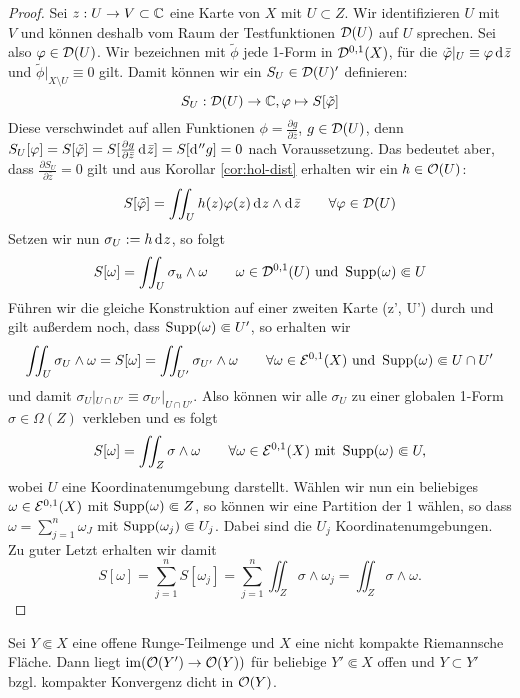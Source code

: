 \begin{proof}
  Sei $z: U \rightarrow V \subset \mathbb{C}$ eine Karte von $X$ mit $U \subset
  Z$. Wir identifizieren $U$ mit $V$ und können deshalb vom Raum der
  Testfunktionen $\mathcal{D}(U)$ auf $U$ sprechen. Sei also $\varphi \in
  \mathcal{D}(U)$. Wir bezeichnen mit $\tilde \phi$ jede 1-Form in
  $\mathcal{D}^{0,1}(X)$, für die $\tilde \phi|_U \equiv \phi \d[\bar z]$ und
  $\tilde \phi |_{X \setminus U} \equiv 0$ gilt. 
  Damit können wir ein $S_U \in \mathcal{D}(U)'$ definieren:
  \[
  S_U: \mathcal{D}(U) \rightarrow \mathbb{C}, \varphi \mapsto S[\tilde {\varphi}]
  \]
  Diese verschwindet auf allen Funktionen $\phi = \frac{\partial
    g}{\partial \bar z}$, $g \in \mathcal{D}(U)$, denn $S_U[\phi] = S[\tilde
  \phi] = S[ \frac{\partial g}{\partial \bar z} \d[\bar z]] =
  S[\d[''g]] = 0$ nach Voraussetzung. Das bedeutet aber, dass
  $\frac{\partial S_U}{\partial \bar z} = 0$ gilt und aus Korollar
  \ref{cor:hol-dist} erhalten wir ein $h \in \mathcal{O}(U)$:
  \[
  S[\tilde \phi] = \iint_U h(z) \phi(z) \d[z] \wedge \d[\bar z] \qquad
  \forall \phi \in \dist(U)
  \]
  Setzen wir nun $\sigma_U := h \d[z]$, so folgt
  \[
  S[\omega] = \iint_U \sigma_u \wedge \omega \qquad \omega \in
  \mathcal{D}^{0,1}(U) \text{ und } \operatorname{Supp}(\omega) \Subset U
  \]
  Führen wir die gleiche Konstruktion auf einer zweiten Karte (z', U')
  durch und gilt außerdem noch, dass $\operatorname{Supp}(\omega) \Subset U'$, so
  erhalten wir
  \[
  \iint_U \sigma_U \wedge \omega = S[\omega] = \iint_{U'} \sigma_{U'}
  \wedge \omega \qquad \forall \omega \in \mathcal{E}^{0,1}(X) \text{ und }
  \operatorname{Supp}(\omega) \Subset U \cap U'
  \]
  und damit $\sigma_U|_{U \cap U'} \equiv \sigma_{U'}|_{U \cap
    U'}$. Also können wir alle $\sigma_U$ zu einer globalen 1-Form
  $\sigma \in \Omega(Z)$ verkleben und es folgt
  \[
  S[\omega] = \iint_Z \sigma \wedge \omega \qquad \forall \omega \in
  \mathcal{E}^{0,1}(X) \text{ mit } \operatorname{Supp}(\omega) \Subset U,
  \]
  wobei $U$ eine Koordinatenumgebung darstellt. 
  Wählen wir nun ein beliebiges $\omega \in \mathcal{E}^{0,1}(X)$ mit
  $\operatorname{Supp}(\omega) \Subset Z$, so können wir eine Partition der 1
  wählen, so dass $\omega = \sum_{j=1}^n \omega_J$ mit
  $\operatorname{Supp}(\omega_j) \Subset U_j$. Dabei sind die $U_j$
  Koordinatenumgebungen. 
  Zu guter Letzt erhalten wir damit
  \[
  S[\omega] = \sum_{j=1}^n S[\omega_j] = \sum_{j=1}^n \iint_Z \sigma
  \wedge \omega_j = \iint_Z \sigma \wedge \omega.
  \]
\end{proof}

\begin{thm}
  \label{thm:runge-dicht}
  Sei $Y \Subset X$ eine offene Runge-Teilmenge und $X$ eine nicht
  kompakte Riemannsche Fläche. 
  Dann liegt $\operatorname{im}( \mathcal{O}(Y') \rightarrow \mathcal{O}(Y))$ für beliebige $Y' \Subset X$
  offen und $Y \subset Y'$ bzgl. kompakter Konvergenz dicht in $\mathcal{O}(Y)$.
\end{thm}

